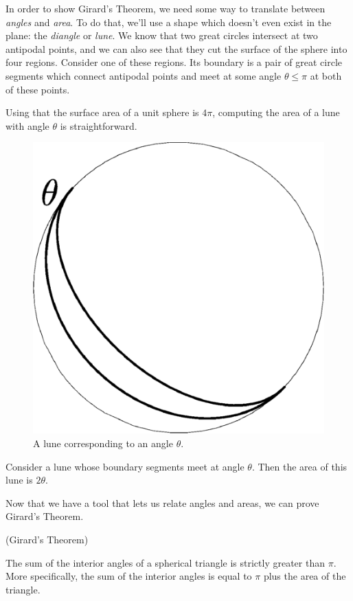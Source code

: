 In order to  show Girard's Theorem, we need some way to translate between \textit{angles} and \textit{area}.  To do that, we'll use a shape which doesn't even exist in the plane: the \textit{diangle} or \textit{lune}.    We know that two great circles intersect at two antipodal points, and we can also see that they cut the surface of the sphere into four regions.  Consider one of these regions.  Its boundary is a pair of great circle segments which connect antipodal points and meet at some angle $\theta\leq \pi$ at both of these points.   

Using that the surface area of a unit sphere is $4\pi$, computing the area of a lune with angle $\theta$ is straightforward.


\begin{figure}[htb]
	\centering
	\includegraphics[width=.35\textwidth]{figs/lune.pdf}
	\caption{A lune corresponding to an angle $\theta$. }
	\label{fig:lune}
\end{figure}

\begin{claim}
	Consider a lune whose boundary segments meet at angle $\theta$.  Then the area of this lune is $2\theta$.
\end{claim}
Now that we have a tool that lets us relate angles and areas, we can prove Girard's Theorem.










\begin{lemma}(Girard's Theorem)\label{lem:sphtri}
	
	The sum of the interior angles of a spherical triangle is strictly greater than $\pi$.  More specifically, the sum of the interior angles is equal to $\pi$ plus the area of the triangle.
\end{lemma}

